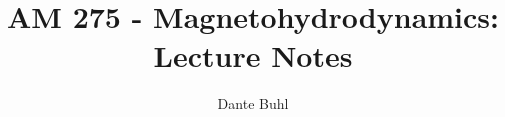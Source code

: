 \documentclass{article}
\begin{document}
\title{AM 275 - Magnetohydrodynamics: Lecture Notes}
\author{Dante Buhl}
\doublespacing

\newcommand{\wrms}{w_{\text{rms}}}
\newcommand{\bs}[1]{\boldsymbol{#1}}
\newcommand{\tb}[1]{\textbf{#1}}
\newcommand{\bmp}[1]{\begin{minipage}{#1\textwidth}}
\newcommand{\emp}{\end{minipage}}
\newcommand{\R}{\mathbb{R}}
\newcommand{\C}{\mathbb{C}}
\newcommand{\N}{\mathcal{N}}
\newcommand{\K}{\bs{\mathrm{K}}}
\newcommand{\m}{\bs{\mu}_*}
\newcommand{\s}{\bs{\Sigma}_*}
\newcommand{\dt}{\Delta t}
\newcommand{\dx}{\Delta x}
\newcommand{\tr}[1]{\text{Tr}(#1)}
\newcommand{\Tr}[1]{\text{Tr}(#1)}
\newcommand{\Div}{\nabla \cdot}
\renewcommand{\div}{\nabla \cdot}
\newcommand{\Curl}{\nabla \times}
\newcommand{\Grad}{\nabla}
\newcommand{\grad}{\nabla}
\newcommand{\grads}{\nabla_s}
\newcommand{\gradf}{\nabla_f}
\newcommand{\xs}{x_s}
\newcommand{\xf}{x_f}
\newcommand{\x}{\bs{x}}
\newcommand{\ts}{t_s}
\newcommand{\tf}{t_f}
\newcommand{\pt}{\partial t}
\newcommand{\pz}{\partial z}
\newcommand{\uvec}{\bs{u}}
\newcommand{\nvec}{\hat{\bs{n}}}
\newcommand{\jvec}{\bs{j}}
\newcommand{\bvec}{\bs{B}}
\newcommand{\B}{\bs{B}}
\newcommand{\evec}{\bs{E}}
\newcommand{\E}{\bs{E}}
\newcommand{\vort}{\bs{\omega}}
\newcommand{\F}{\bs{F}}
\newcommand{\T}{\tilde{T}}
\newcommand{\ez}{\bs{e}_z}
\newcommand{\ex}{\bs{e}_x}
\newcommand{\ey}{\bs{e}_y}
\newcommand{\thetahat}{\hat{\bs{\theta}}}
\newcommand{\rhat}{\hat{\bs{r}}}
\newcommand{\zhat}{\hat{\bs{z}}}
\newcommand{\eo}{\bs{e}_{\bs{\Omega}}}
\newcommand{\ppt}[1]{\frac{\partial #1}{\partial t}}
\newcommand{\pptwo}[2]{\frac{\partial^2 #1}{\partial #2^2}}
\newcommand{\ppthree}[2]{\frac{\partial^3 #1}{\partial #2^3}}
\newcommand{\pp}[2]{\frac{\partial #1}{\partial #2}}
\newcommand{\ddt}[1]{\frac{d #1}{d t}}
\newcommand{\DDt}[1]{\frac{D #1}{D t}}
\newcommand{\DD}[2]{\frac{D #1}{D #2}}
\newcommand{\ppts}[1]{\frac{\partial #1}{\partial t_s}}
\newcommand{\pptf}[1]{\frac{\partial #1}{\partial t_f}}
\newcommand{\ppz}[1]{\frac{\partial #1}{\partial z}}
\newcommand{\ddz}[1]{\frac{d #1}{d z}}
\newcommand{\dd}[2]{\frac{d #1}{d #2}}
\newcommand{\ppzetas}[1]{\frac{\partial^2 #1}{\partial \zeta^2}}
\newcommand{\ppzs}[1]{\frac{\partial #1}{\partial z_s}}
\newcommand{\ppzf}[1]{\frac{\partial #1}{\partial z_f}}
\newcommand{\ppx}[1]{\frac{\partial #1}{\partial x}}
\newcommand{\ppxi}[1]{\frac{\partial #1}{\partial x_i}}
\newcommand{\ppxj}[1]{\frac{\partial #1}{\partial x_j}}
\newcommand{\ppy}[1]{\frac{\partial #1}{\partial y}}
\newcommand{\ppzeta}[1]{\frac{\partial #1}{\partial \zeta}}
\end{document}
